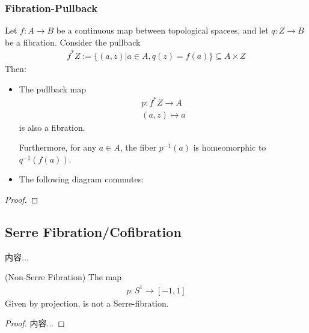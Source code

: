 \documentclass[Total.tex]{subfiles}
\begin{document}
				\subsubsection{Fibration-Pullback}
				\begin{lemma}
					Let $f:A\rightarrow B$ be a continuous map between topological spacees, and let $q:Z\rightarrow B$ be a fibration. Consider the pullback
					\begin{gather*}
						f^*Z:=\{(a,z)|a\in A,q(z)=f(a)\}\subseteq A\times Z
					\end{gather*}
					Then:
					\begin{itemize}
						\item The pullback map
						\begin{gather*}
							p:f^*Z\rightarrow A\\
							(a,z)\mapsto a
						\end{gather*}
						is also a fibration.
						
						Furthermore, for any $a\in A$, the fiber $p^{-1}(a)$ is homeomorphic to $q^{-1}(f(a))$. 
						\item The following diagram commutes:
						\begin{center}
						\end{center}
					\end{itemize}
					\end{lemma}
				\begin{proof}
				\end{proof}
			\subsection{Serre Fibration/Cofibration}
				
				\begin{Def}
					内容...
				\end{Def}
				\begin{lemma}
					(Non-Serre Fibration) The map
					\begin{gather*}
						p:S^1\rightarrow [-1,1]
					\end{gather*}
					Given by projection, is not a Serre-fibration.
				\end{lemma}
				\begin{proof}
					内容...
				\end{proof}
\end{document}

